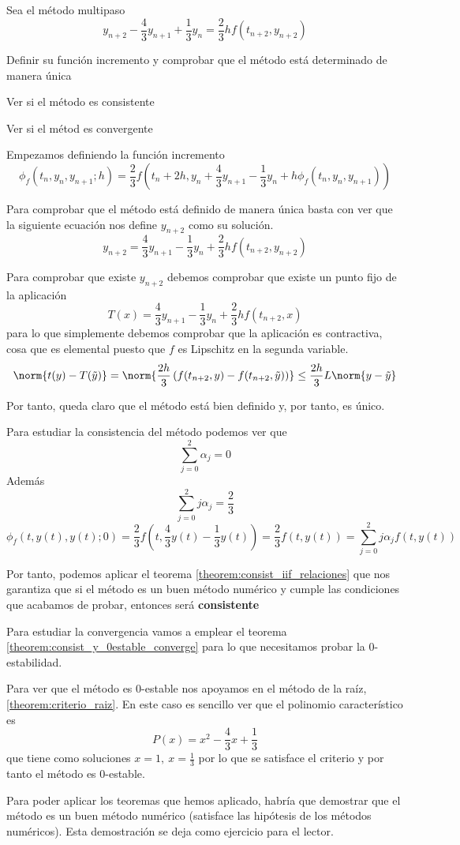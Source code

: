 \begin{problem}[5]
Sea el método multipaso
\[y_{n+2} - \frac{4}{3}y_{n+1}+\frac{1}{3}y_n = \frac{2}{3}hf(t_{n+2},y_{n+2})\]

\ppart Definir su función incremento y comprobar que el método está determinado de manera única

\ppart Ver si el método es consistente

\ppart Ver si el métod es convergente
\solution

\spart
Empezamos definiendo la función incremento
\[\phi_f(t_n,y_n,y_{n+1};h) = \frac{2}{3}f\left(t_n+2h,y_n+\frac{4}{3}y_{n+1}-\frac{1}{3}y_n+h\phi_f(t_n,y_n,y_{n+1})\right)\]


Para comprobar que el método está definido de manera única basta con ver que la siguiente ecuación nos define $y_{n+2}$ como su solución.
\[y_{n+2} = \frac{4}{3}y_{n+1}-\frac{1}{3}y_n + \frac{2}{3}hf(t_{n+2},y_{n+2})\]

Para comprobar que existe $y_{n+2}$ debemos comprobar que existe un punto fijo de la aplicación 
\[T(x) =  \frac{4}{3}y_{n+1}-\frac{1}{3}y_n + \frac{2}{3}hf(t_{n+2},x)\]
para lo que simplemente debemos comprobar que la aplicación es contractiva, cosa que es elemental puesto que $f$ es Lipschitz en la segunda variable.
\[\norm{t(y)-T(\tilde{y})} = \norm{\frac{2h}{3} \left( f(t_{n+2},y) - f(t_{n+2},\tilde{y})\right)} \leq \frac{2h}{3}L\norm{y - \tilde{y}}\]

Por tanto, queda claro que el método está bien definido y, por tanto, es único.

\spart

Para estudiar la consistencia del método podemos ver que
\[\sum_{j=0}^2 α_j = 0\]
Además
\[\sum_{j=0}^2jα_j = \frac{2}{3}\]
\[\phi_f(t,y(t),y(t);0) = \frac{2}{3}f(t,\frac{4}{3}y(t)-\frac{1}{3}y(t)) = \frac{2}{3}f(t,y(t)) = \sum_{j=0}^2 jα_j f(t,y(t))\]

Por tanto, podemos aplicar el teorema \ref{theorem:consist_iif_relaciones} que nos garantiza que si el método es un buen método numérico y cumple las condiciones que acabamos de probar, entonces será \textbf{consistente}

\spart

Para estudiar la convergencia vamos a emplear el teorema \ref{theorem:consist_y_0estable_converge} para lo que necesitamos probar la 0-estabilidad.

Para ver que el método es 0-estable nos apoyamos en el método de la raíz, \ref{theorem:criterio_raiz}. En este caso es sencillo ver que el polinomio característico es
\[P(x)=x^2-\frac{4}{3}x+\frac{1}{3}\]
que tiene como soluciones $x=1, \ x=\frac{1}{3}$ por lo que se satisface el criterio y por tanto el método es 0-estable.

\obs Para poder aplicar los teoremas que hemos aplicado, habría que demostrar que el método es un buen método numérico (satisface las hipótesis de los métodos numéricos). Esta demostración se deja como ejercicio para el lector.

\end{problem}

